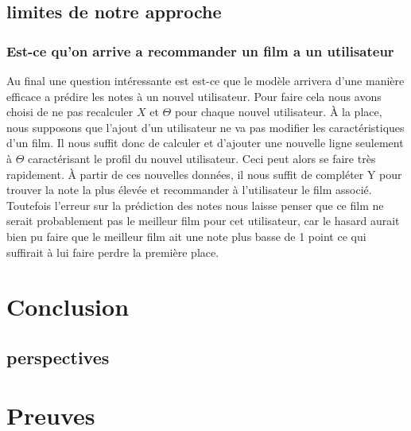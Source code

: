\documentclass[a4paper,10pt]{article}
\begin{document}
\subsection{limites de notre approche} 
\subsubsection{Est-ce qu'on arrive a recommander un film a un utilisateur}
Au final une question intéressante est est-ce que le modèle arrivera d'une manière efficace a prédire les notes à un nouvel utilisateur. Pour faire cela nous avons
choisi de ne pas recalculer $X$ et $\Theta$ pour chaque nouvel utilisateur. À la place, nous supposons que l'ajout d'un utilisateur ne va pas modifier
les caractéristiques d'un film. Il nous suffit donc de calculer et d'ajouter une nouvelle ligne seulement à $\Theta$ caractérisant le profil du nouvel utilisateur. Ceci peut alors se faire très rapidement. À partir de ces nouvelles données, il nous suffit de compléter Y pour trouver la note la plus élevée et recommander à l'utilisateur le film associé. Toutefois l'erreur sur la prédiction des notes nous laisse penser que ce film ne serait probablement pas le meilleur film pour cet utilisateur, car le hasard aurait bien pu faire que le meilleur film ait une note plus basse de 1 point ce qui suffirait à lui faire perdre la première place.
\section{Conclusion}

\subsection{perspectives}
\appendix 
\section{Preuves} 
\end{document}
